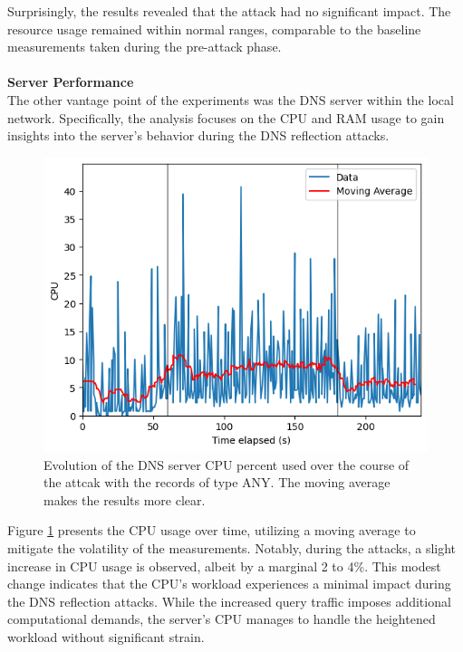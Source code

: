 Surprisingly, the results revealed that the attack had no significant impact. The resource usage remained within normal ranges, comparable to the baseline measurements taken during the pre-attack phase.\\
\\
\noindent \textbf{Server Performance}\\
The other vantage point of the experiments was the DNS server within the local network. Specifically, the analysis focuses on the CPU and RAM usage to gain insights into the server's behavior during the DNS reflection attacks.
\begin{figure}[H]
    \centering
    \includegraphics[width=\columnwidth]{Sections/Images/Server_CPU_ANY10.png}
    \caption{Evolution of the DNS server CPU percent used over the course of the attcak with the records of type ANY. The moving average makes the results more clear.}
    \label{fig:Server_CPU1}
\end{figure}
\noindent Figure \ref{fig:Server_CPU1} presents the CPU usage over time, utilizing a moving average to mitigate the volatility of the measurements. Notably, during the attacks, a slight increase in CPU usage is observed, albeit by a marginal 2 to 4\%. This modest change indicates that the CPU's workload experiences a minimal impact during the DNS reflection attacks. While the increased query traffic imposes additional computational demands, the server's CPU manages to handle the heightened workload without significant strain. \\
